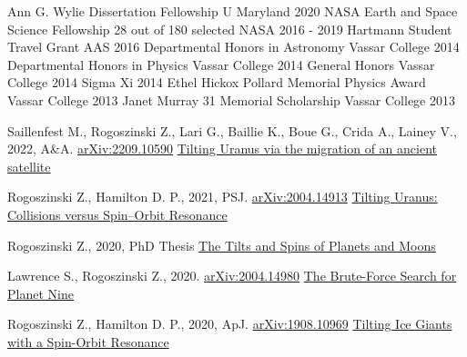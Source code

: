 \documentclass[]{awesome-cv}
\begin{document}
\vspace{-4mm}


\begin{cvhonors}
	\cvhonor
	{Ann G. Wylie Dissertation Fellowship}
	{}
	{U Maryland}
	{2020}
	\cvhonor
	{NASA Earth and Space Science Fellowship}
	{28 out of 180 selected}
	{NASA}
	{2016 - 2019}
	\cvhonor
	{Hartmann Student Travel Grant}
	{}
	{AAS}
	{2016}
	\cvhonor
	{Departmental Honors in Astronomy}
	{}
	{Vassar College}
	{2014}
	\cvhonor
	{Departmental Honors in Physics}
	{}
	{Vassar College}
	{2014}
	\cvhonor
	{General Honors}
	{}
	{Vassar College}
	{2014}
	\cvhonor
	{Sigma Xi}
	{}
	{}
	{2014}
	\cvhonor
	{Ethel Hickox Pollard Memorial Physics Award}
	{}
	{Vassar College}
	{2013}
	\cvhonor
	{Janet Murray \textquotesingle{}31 Memorial Scholarship}
	{}
	{Vassar College}
	{2013}
\end{cvhonors}
\begin{cventries}
	\cventry
	{Saillenfest M., Rogoszinski Z., Lari G., Baillie K., Boue G., Crida A., Lainey V., 2022, A\&A. \href{https://arxiv.org/pdf/2209.10590.pdf}{arXiv:2209.10590}}
	{\href{https://arxiv.org/abs/2209.10590}{Tilting Uranus via the migration of an ancient satellite}}
	{}
	{}
	{}
	
	\vspace{-5mm}
	
	\cventry
	{Rogoszinski Z., Hamilton D. P., 2021, PSJ. \href{https://arxiv.org/pdf/2004.14913.pdf}{arXiv:2004.14913}}
	{\href{https://ui.adsabs.harvard.edu/abs/2020arXiv200414913R/abstract}{Tilting Uranus: Collisions versus Spin--Orbit Resonance}}
	{}
	{}
	{}
	
	\vspace{-5mm}
	
	\cventry
	{Rogoszinski Z., 2020, PhD Thesis}
	{\href{https://drum.lib.umd.edu/handle/1903/26852}{The Tilts and Spins of Planets and Moons}}
	{}
	{}
	{}
	
	\vspace{-5mm}
	
	\cventry
	{Lawrence S., Rogoszinski Z., 2020. \href{https://arxiv.org/pdf/2004.14980.pdf}{arXiv:2004.14980}}
	{\href{https://ui.adsabs.harvard.edu/abs/2020arXiv200414980L/abstract}{The Brute-Force Search for Planet Nine}}
	{}
	{}
	{}
	
	\vspace{-5mm}
	
	\cventry
	{Rogoszinski Z., Hamilton D. P., 2020, ApJ. \href{https://arxiv.org/pdf/1908.10969.pdf}{arXiv:1908.10969}}
	{\href{https://ui.adsabs.harvard.edu/abs/2020ApJ...888...60R/abstract}{Tilting Ice Giants with a Spin-Orbit Resonance}}
	{}
	{}
	{}
	
	\vspace{-6mm}
\end{cventries}
\end{document}
